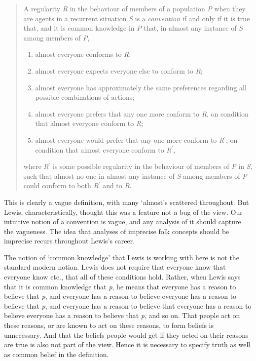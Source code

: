 \begin{quote}A regularity \textit{R} in the behaviour of members of a population \textit{P} when they are agents in a recurrent situation \textit{S} is a \textit{convention} if and only if it is true that, and it is common knowledge in \textit{P} that, in almost any instance of \textit{S} among members of \textit{P}, 
\begin{enumerate}
\item almost everyone conforms to \textit{R};
\item almost everyone expects everyone else to conform to \textit{R};
\item almost everyone has approximately the same preferences regarding all possible combinations of actions; 
\item almost everyone prefers that any one more conform to \textit{R}, on condition that almost everyone conform to \textit{R};
\item almost everyone would prefer that any one more conform to \textit{R}\(^\prime\), on condition that almost everyone conform to \textit{R}\(^\prime\),
\end{enumerate}

\noindent where \textit{R}\(^\prime\) is some possible regularity in the behaviour of members of \textit{P} in \textit{S}, such that almost no one in almost any instance of \textit{S} among members of \textit{P} could conform to both \textit{R}\(^\prime\) and to \textit{R}. \citep[78]{Lewis1969a}

\end{quote}

This is clearly a vague definition, with many `almost's scattered throughout. But Lewis, characteristically, thought this was a feature not a bug of the view. Our intuitive notion of a convention is vague, and any analysis of it should capture the vagueness. The idea that analyses of imprecise folk concepts should be imprecise recurs throughout Lewis's career.

The notion of `common knowledge' that Lewis is working with here is not the standard modern notion. Lewis does not require that everyone know that everyone know etc., that all of these conditions hold. Rather, when Lewis says that it is common knowledge that \textit{p}, he means that everyone has a reason to believe that \textit{p}, and everyone has a reason to believe everyone has a reason to believe that \textit{p}, and everyone has a reason to believe that everyone has a reason to believe everyone has a reason to believe that \textit{p}, and so on. That people act on these reasons, or are known to act on these reasons, to form beliefs is unnecessary. And that the beliefs people would get if they acted on their reasons are true is also not part of the view. Hence it is necessary to specify truth as well as common belief in the definition.

